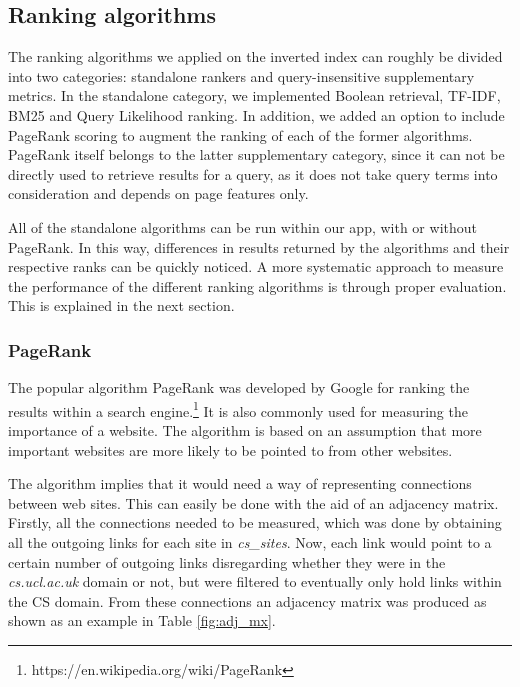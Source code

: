 
\subsection{Ranking algorithms}
\label{sub:ranking}

The ranking algorithms we applied on the inverted index can roughly be divided into two categories: standalone rankers and query-insensitive supplementary metrics. In the standalone category, we implemented Boolean retrieval, TF-IDF, BM25 and Query Likelihood ranking. In addition, we added an option to include PageRank scoring to augment the ranking of each of the former algorithms. PageRank itself belongs to the latter supplementary category, since it can not be directly used to retrieve results for a query, as it does not take query terms into consideration and depends on page features only.

All of the standalone algorithms can be run within our app, with or without PageRank. In this way, differences in results returned by the algorithms and their respective ranks can be quickly noticed. A more systematic approach to measure the performance of the different ranking algorithms is through proper evaluation. This is explained in the next section.


\subsubsection{PageRank} %
\label{ssub:pagerank}

The popular algorithm PageRank was developed by Google for ranking the results within a search engine.\footnote{https://en.wikipedia.org/wiki/PageRank} It is also commonly used for measuring the importance of a website. The algorithm is based on an assumption that more important websites are more likely to be pointed to from other websites.

The algorithm implies that it would need a way of representing connections between web sites. This can easily be done with the aid of an adjacency matrix. Firstly, all the connections needed to be measured, which was done by obtaining all the outgoing links for each site in \emph{cs\_sites}. Now, each link would point to a certain number of outgoing links disregarding whether they were in the \emph{cs.ucl.ac.uk} domain or not, but were filtered to eventually only hold links within the CS domain. From these connections an adjacency matrix was produced as shown as an example in Table \ref{fig:adj_mx}. 

